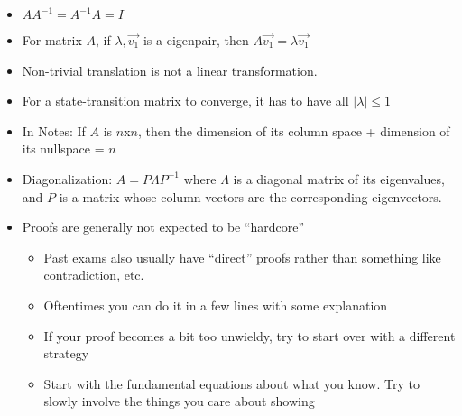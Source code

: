 \documentclass{article}
\begin{document}
\begin{itemize}
	\item $AA^{-1} = A^{-1}A = I$
	\item For matrix $A$, if $\lambda, \vec{v_1}$ is a eigenpair, then $A\vec{v_1} = \lambda\vec{v_1}$
	\item Non-trivial translation is not a linear transformation.
	\item For a state-transition matrix to converge, it has to have all $|\lambda|\leq1$
	\item In Notes: If $A$ is $n$x$n$, then the dimension of its column space + dimension of its nullspace = $n$
	\item Diagonalization: $A = P\Lambda P^{-1}$ where $\Lambda$ is a diagonal matrix of its eigenvalues, and $P$ is a matrix whose column vectors are the corresponding eigenvectors.
	\item Proofs are generally not expected to be ``hardcore''
	\begin{itemize}
		\item Past exams also usually have “direct” proofs rather than something like contradiction, etc.
		\item Oftentimes you can do it in a few lines with some explanation
		\item If your proof becomes a bit too unwieldy, try to start over with a different strategy
		\item Start with the fundamental equations about what you know. Try to slowly involve the things you care about showing
	\end{itemize}
\end{itemize}
\end{document}
